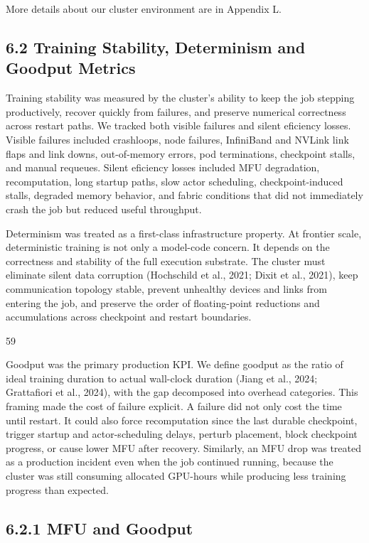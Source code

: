 \documentclass[
  10
]{article}
\begin{document}
More details about our cluster environment are in Appendix L.

\subsection{6.2 Training Stability, Determinism and Goodput
Metrics}\label{training-stability-determinism-and-goodput-metrics}

Training stability was measured by the cluster's ability to keep the job
stepping productively, recover quickly from failures, and preserve
numerical correctness across restart paths. We tracked both visible
failures and silent eficiency losses. Visible failures included
crashloops, node failures, InfiniBand and NVLink link flaps and link
downs, out-of-memory errors, pod terminations, checkpoint stalls, and
manual requeues. Silent eficiency losses included MFU degradation,
recomputation, long startup paths, slow actor scheduling,
checkpoint-induced stalls, degraded memory behavior, and fabric
conditions that did not immediately crash the job but reduced useful
throughput.

Determinism was treated as a first-class infrastructure property. At
frontier scale, deterministic training is not only a model-code concern.
It depends on the correctness and stability of the full execution
substrate. The cluster must eliminate silent data corruption (Hochschild
et al., 2021; Dixit et al., 2021), keep communication topology stable,
prevent unhealthy devices and links from entering the job, and preserve
the order of floating-point reductions and accumulations across
checkpoint and restart boundaries.

59

Goodput was the primary production KPI. We define goodput as the ratio
of ideal training duration to actual wall-clock duration (Jiang et al.,
2024; Grattafiori et al., 2024), with the gap decomposed into overhead
categories. This framing made the cost of failure explicit. A failure
did not only cost the time until restart. It could also force
recomputation since the last durable checkpoint, trigger startup and
actor-scheduling delays, perturb placement, block checkpoint progress,
or cause lower MFU after recovery. Similarly, an MFU drop was treated as
a production incident even when the job continued running, because the
cluster was still consuming allocated GPU-hours while producing less
training progress than expected.

\subsection{6.2.1 MFU and Goodput}\label{mfu-and-goodput}
\end{document}
